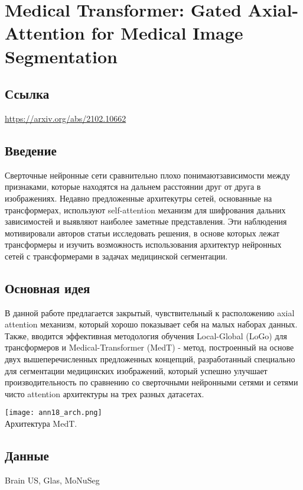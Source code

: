 \section{Medical Transformer: Gated Axial-Attention for
Medical Image Segmentation}

\subsection*{Ссылка} \url{https://arxiv.org/abs/2102.10662}
\subsection*{Введение}
Сверточные нейронные сети сравнительно плохо \glqq понимают\grqq зависимости между 
признаками, которые находятся на дальнем расстоянии друг от друга в изображениях. Недавно предложенные 
архитекутры сетей, основанные на трансформерах, используют self-attention механизм для шифрования
дальних зависимостей и выявляют наиболее заметные представления. Эти наблюдения мотивировали авторов 
статьи исследовать решения, в основе которых лежат трансформеры и изучить возможность 
использования архитектур нейронных сетей с трансформерами в задачах медицинской сегментации.

\subsection*{Основная идея}
В данной работе предлагается закрытый, чувствительный к расположению axial attention механизм, который 
хорошо показывает себя на малых наборах данных. Также, вводится эффективная 
методология обучения Local-Global (LoGo)
для трансформеров и Medical-Transformer (MedT) -  метод, построенный на основе двух вышеперечисленных 
предложенных концепций, разработанный специально для сегментации медицинских изображений, который успешно 
улучшает производительность по сравнению со сверточными нейронными сетями и сетями чисто attention архитектуры 
на трех разных датасетах.\\
\begin{minipage}{1.0\linewidth}
    \begin{center}
        \texttt{[image: ann18\_arch.png]} \\
        \caption{\scriptsize{
           Архитектура MedT.
        }}
    \end{center}
    
\end{minipage} 
\subsection*{Данные}
Brain US, Glas, MoNuSeg
